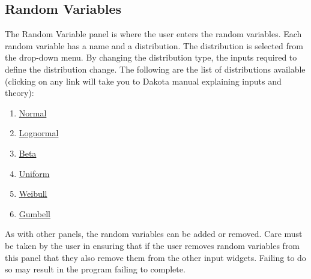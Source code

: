 \subsection{Random Variables}
The Random Variable panel is where the user enters the random
variables. Each random variable has a name and a distribution. The
distribution is selected from the drop-down menu. By changing the
distribution type, the inputs required to define the distribution
change. The following are the list of distributions available (clicking on any link will take you to Dakota manual explaining inputs and theory):
\begin{enumerate}
\item \href{https://dakota.sandia.gov//sites/default/files/docs/6.9/html-ref/variables-normal_uncertain.html}{Normal}
\item \href{https://dakota.sandia.gov//sites/default/files/docs/6.9/html-ref/variables-lognormal_uncertain.html}{Lognormal}
\item \href{https://dakota.sandia.gov//sites/default/files/docs/6.9/html-ref/variables-beta_uncertain.html}{Beta}
\item \href{https://dakota.sandia.gov//sites/default/files/docs/6.9/html-ref/variables-uniform_uncertain.html}{Uniform}
\item \href{https://dakota.sandia.gov//sites/default/files/docs/6.9/html-ref/variables-weibull_uncertain.html}{Weibull}
\item \href{https://dakota.sandia.gov//sites/default/files/docs/6.9/html-ref/variables-gumbell_uncertain.html}{Gumbell}
\end{enumerate} 

As with other panels, the random variables can be added or
removed. Care must be taken by the user in ensuring that if the user
removes random variables from this panel that they also remove them
from the other input widgets. Failing to do so may result in the
program failing to complete.
